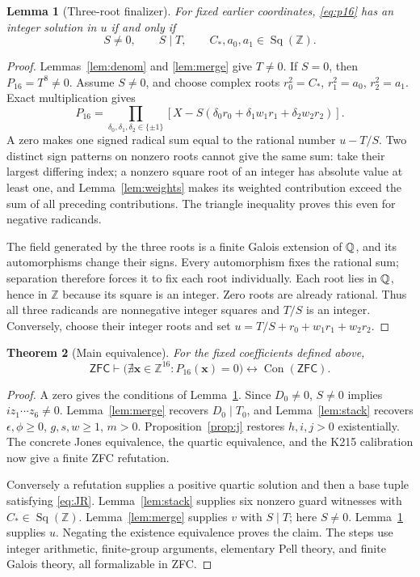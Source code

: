 \documentclass[11pt]{article}
\newtheorem{theorem}{Theorem}[section]
\newtheorem{lemma}[theorem]{Lemma}
\theoremstyle{remark}\newtheorem{remark}[theorem]{Remark}
\newcommand{\Z}{\mathbb Z}\newcommand{\N}{\mathbb N}
\newcommand{\Sq}{\operatorname{Sq}(\Z)}
\newcommand{\ZFC}{\mathsf{ZFC}}\newcommand{\Con}{\operatorname{Con}(\ZFC)}
\begin{document}
\begin{lemma}[Three-root finalizer]\label{lem:finalizer}
For fixed earlier coordinates, \eqref{eq:p16} has an integer solution in $u$
if and only if
\[
 S\ne0,\qquad S\mid T,\qquad C_*,a_0,a_1\in\Sq.
\]
\end{lemma}
\begin{proof}
Lemmas~\ref{lem:denom} and \ref{lem:merge} give $T\ne0$. If $S=0$,
then $P_{16}=T^8\ne0$. Assume $S\ne0$, and choose complex roots
$r_0^2=C_*$, $r_1^2=a_0$, $r_2^2=a_1$. Exact multiplication gives
\[
 P_{16}=\prod_{\delta_0,\delta_1,\delta_2\in\{\pm1\}}
 [X-S(\delta_0r_0+\delta_1w_1r_1+\delta_2w_2r_2)].
\]
A zero makes one signed radical sum equal to the rational number $u-T/S$.
Two distinct sign patterns on nonzero roots cannot give the same sum:
take their largest differing index; a nonzero square root of an integer has
absolute value at least one, and Lemma~\ref{lem:weights} makes its weighted
contribution exceed the sum of all preceding contributions. The triangle
inequality proves this even for negative radicands.

The field generated by the three roots is a finite Galois extension of
$\mathbb Q$, and its automorphisms change their signs. Every automorphism fixes
the rational sum; separation therefore forces it to fix each root individually.
Each root lies in $\mathbb Q$, hence in $\Z$ because its square is an integer.
Zero roots are already rational. Thus all three radicands are nonnegative
integer squares and $T/S$ is an integer. Conversely, choose their integer
roots and set $u=T/S+r_0+w_1r_1+w_2r_2$.
\end{proof}

\begin{theorem}[Main equivalence]\label{thm:main}
For the fixed coefficients defined above,
\[
 \ZFC\vdash
 \bigl(\nexists\mathbf x\in\Z^{16}:P_{16}(\mathbf x)=0\bigr)
 \longleftrightarrow\Con.
\]
\end{theorem}
\begin{proof}
A zero gives the conditions of Lemma~\ref{lem:finalizer}.
Since $D_0\ne0$, $S\ne0$ implies $i z_1\cdots z_6\ne0$.
Lemma~\ref{lem:merge} recovers $D_0\mid T_0$, and
Lemma~\ref{lem:stack} recovers $\epsilon,\phi\ge0$, $g,s,w\ge1$, $m>0$.
Proposition~\ref{prop:j} restores $h,i,j>0$ existentially. The concrete
Jones equivalence, the quartic equivalence, and the K215 calibration now
give a finite ZFC refutation.

Conversely a refutation supplies a positive quartic solution and then a
base tuple satisfying \eqref{eq:JR}. Lemma~\ref{lem:stack} supplies six
nonzero guard witnesses with $C_*\in\Sq$. Lemma~\ref{lem:merge} supplies
$v$ with $S\mid T$; here $S\ne0$. Lemma~\ref{lem:finalizer} supplies $u$.
Negating the existence equivalence proves the claim. The steps use integer
arithmetic, finite-group arguments, elementary Pell theory, and finite Galois
theory, all formalizable in ZFC.
\end{proof}
\end{document}
